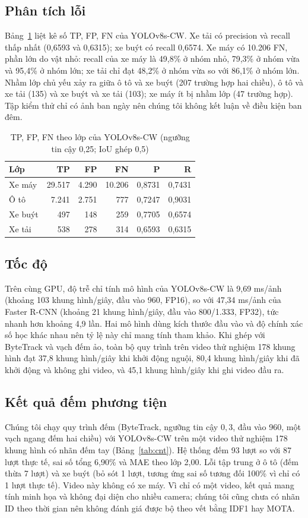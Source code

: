 \documentclass[10pt,journal,letterpaper]{IEEEtran}
\begin{document}
\subsection{Phân tích lỗi}
Bảng~\ref{tab:err} liệt kê số TP, FP, FN của YOLOv8s-CW. Xe tải có precision và recall thấp nhất (0,6593 và 0,6315); xe buýt có recall 0,6574. Xe máy có 10.206 FN, phần lớn do vật nhỏ: recall của xe máy là 49,8\% ở nhóm nhỏ, 79,3\% ở nhóm vừa và 95,4\% ở nhóm lớn; xe tải chỉ đạt 48,2\% ở nhóm vừa so với 86,1\% ở nhóm lớn. Nhầm lớp chủ yếu xảy ra giữa ô tô và xe buýt (207 trường hợp hai chiều), ô tô và xe tải (135) và xe buýt và xe tải (103); xe máy ít bị nhầm lớp (47 trường hợp). Tập kiểm thử chỉ có ảnh ban ngày nên chúng tôi không kết luận về điều kiện ban đêm.

\begin{table}[!t]
\caption{TP, FP, FN theo lớp của YOLOv8s-CW (ngưỡng tin cậy 0,25; IoU ghép 0,5)}
\label{tab:err}
\centering
\footnotesize
\begin{tabular}{lrrrrr}
\toprule
Lớp & TP & FP & FN & P & R \\
\midrule
Xe máy & 29.517 & 4.290 & 10.206 & 0,8731 & 0,7431 \\
Ô tô & 7.241 & 2.751 & 777 & 0,7247 & 0,9031 \\
Xe buýt & 497 & 148 & 259 & 0,7705 & 0,6574 \\
Xe tải & 538 & 278 & 314 & 0,6593 & 0,6315 \\
\bottomrule
\end{tabular}
\end{table}

\subsection{Tốc độ}
Trên cùng GPU, độ trễ chỉ tính mô hình của YOLOv8s-CW là 9,69 ms/ảnh (khoảng 103 khung hình/giây, đầu vào 960, FP16), so với 47,34 ms/ảnh của Faster R-CNN (khoảng 21 khung hình/giây, đầu vào 800/1.333, FP32), tức nhanh hơn khoảng 4,9 lần. Hai mô hình dùng kích thước đầu vào và độ chính xác số học khác nhau nên tỷ lệ này chỉ mang tính tham khảo. Khi ghép với ByteTrack và vạch đếm ảo, toàn bộ quy trình trên video thử nghiệm 178 khung hình đạt 37,8 khung hình/giây khi khởi động nguội, 80,4 khung hình/giây khi đã khởi động và không ghi video, và 45,1 khung hình/giây khi ghi video đầu ra.

\subsection{Kết quả đếm phương tiện}
Chúng tôi chạy quy trình đếm (ByteTrack, ngưỡng tin cậy $0{,}3$, đầu vào 960, một vạch ngang đếm hai chiều) với YOLOv8s-CW trên một video thử nghiệm 178 khung hình có nhãn đếm tay (Bảng~\ref{tab:cnt}). Hệ thống đếm 93 lượt so với 87 lượt thực tế, sai số tổng 6,90\% và MAE theo lớp 2,00. Lỗi tập trung ở ô tô (đếm thừa 7 lượt) và xe buýt (bỏ sót 1 lượt, tương ứng sai số tương đối 100\% vì chỉ có 1 lượt thực tế). Video này không có xe máy. Vì chỉ có một video, kết quả mang tính minh họa và không đại diện cho nhiều camera; chúng tôi cũng chưa có nhãn ID theo thời gian nên không đánh giá được bộ theo vết bằng IDF1 hay MOTA.
\end{document}
